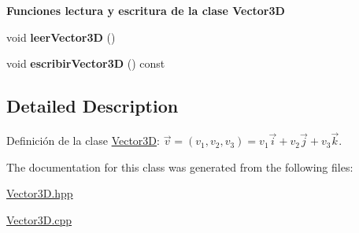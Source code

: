 \begin{Indent}{\bf Funciones lectura y escritura de la clase Vector3D}\par
\begin{DoxyCompactItemize}
\item 
void {\bfseries leer\+Vector3D} ()\hypertarget{classed_1_1Vector3D_a383b32d61696badf77dac30aca5211a3}{}\label{classed_1_1Vector3D_a383b32d61696badf77dac30aca5211a3}

\item 
void {\bfseries escribir\+Vector3D} () const \hypertarget{classed_1_1Vector3D_a1c8716af1cd30d8bf38a0e6bf2dee24f}{}\label{classed_1_1Vector3D_a1c8716af1cd30d8bf38a0e6bf2dee24f}

\end{DoxyCompactItemize}
\end{Indent}


\subsection{Detailed Description}
Definición de la clase \hyperlink{classed_1_1Vector3D}{Vector3D}\+: $ \vec{v} = (v_1, v_2, v_3) = v_1 \vec{i} + v_2 \vec{j} + v_3 \vec{k} $. 

The documentation for this class was generated from the following files\+:\begin{DoxyCompactItemize}
\item 
\hyperlink{Vector3D_8hpp}{Vector3\+D.\+hpp}\item 
\hyperlink{Vector3D_8cpp}{Vector3\+D.\+cpp}\end{DoxyCompactItemize}
